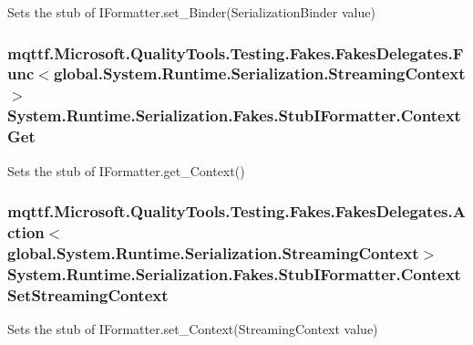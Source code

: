 Sets the stub of I\-Formatter.\-set\-\_\-\-Binder(\-Serialization\-Binder value)

\hypertarget{class_system_1_1_runtime_1_1_serialization_1_1_fakes_1_1_stub_i_formatter_aab65ae3a58ff2ef55d7ffc6ed1d292f5}{
\subsubsection[{Context\-Get}]{\setlength{\rightskip}{0pt plus 5cm}mqttf.\-Microsoft.\-Quality\-Tools.\-Testing.\-Fakes.\-Fakes\-Delegates.\-Func$<$global.\-System.\-Runtime.\-Serialization.\-Streaming\-Context$>$ System.\-Runtime.\-Serialization.\-Fakes.\-Stub\-I\-Formatter.\-Context\-Get}}\label{class_system_1_1_runtime_1_1_serialization_1_1_fakes_1_1_stub_i_formatter_aab65ae3a58ff2ef55d7ffc6ed1d292f5}


Sets the stub of I\-Formatter.\-get\-\_\-\-Context()

\hypertarget{class_system_1_1_runtime_1_1_serialization_1_1_fakes_1_1_stub_i_formatter_a8dafc45d8ea4d479d96ea119c9dea8d4}{
\subsubsection[{Context\-Set\-Streaming\-Context}]{\setlength{\rightskip}{0pt plus 5cm}mqttf.\-Microsoft.\-Quality\-Tools.\-Testing.\-Fakes.\-Fakes\-Delegates.\-Action$<$global.\-System.\-Runtime.\-Serialization.\-Streaming\-Context$>$ System.\-Runtime.\-Serialization.\-Fakes.\-Stub\-I\-Formatter.\-Context\-Set\-Streaming\-Context}}\label{class_system_1_1_runtime_1_1_serialization_1_1_fakes_1_1_stub_i_formatter_a8dafc45d8ea4d479d96ea119c9dea8d4}


Sets the stub of I\-Formatter.\-set\-\_\-\-Context(\-Streaming\-Context value)

